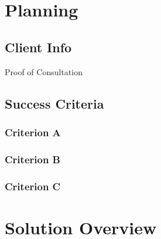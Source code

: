\documentclass[12pt]{article} %
\begin{document}
\tableofcontents %

\newpage %


\section{Planning} %



\subsection{Client Info} %
Proof of Consultation



\subsection{Success Criteria} %




\subsubsection{Criterion A } %

\subsubsection{Criterion B}

\subsubsection{Criterion C}

\newpage

\section{Solution Overview} %
\end{document}
